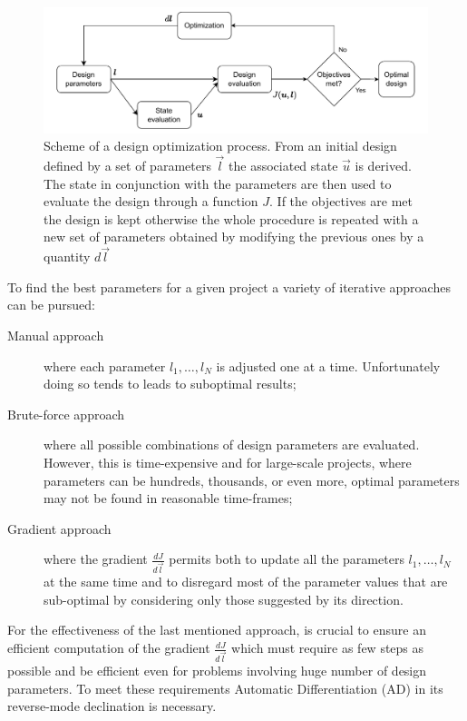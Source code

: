 \begin{figure}
	\centering
	\includegraphics[width=\textwidth]{img/design_opt_scheme.pdf}
	\caption{Scheme of a design optimization process. From an initial design defined by a set of parameters $\vec{l}$ the associated state $\vec{u}$ is derived. The state in conjunction with the parameters are then used to evaluate the design through a function $J$. If the objectives are met the design is kept otherwise the whole procedure is repeated with a new set of parameters obtained by modifying the previous ones by a quantity $d\vec{l}$} 
	\label{fig:design_opt_scheme}
\end{figure}

To find the best parameters for a given project a variety of iterative approaches can be pursued:
\begin{description}
	\item[Manual approach] where each parameter $l_1, \dots, l_N$ is adjusted one at a time. Unfortunately doing so tends to leads to suboptimal results;
	\item[Brute-force approach] where all possible combinations of design parameters are evaluated. However, this is time-expensive and for large-scale projects, where parameters can be hundreds, thousands, or even more, optimal parameters may not be found in reasonable time-frames;
	\item[Gradient approach] where the gradient $\frac{dJ}{d\vec{l}}$ permits both to update all the parameters $l_1, \dots, l_N$ at the same time and to disregard most of the parameter values that are sub-optimal by considering only those suggested by its direction.
\end{description}
For the effectiveness of the last mentioned approach, is crucial to ensure an efficient computation of the gradient $\frac{dJ}{d\vec{l}}$ which must require as few steps as possible and be efficient even for problems involving huge number of design parameters. To meet these requirements Automatic Differentiation (AD) in its reverse-mode declination is necessary.


